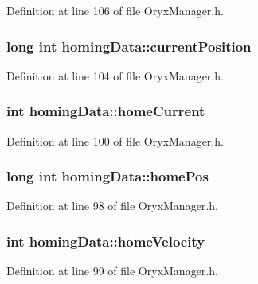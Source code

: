 \-Definition at line 106 of file \-Oryx\-Manager.\-h.

\subsubsection[{current\-Position}]{\setlength{\rightskip}{0pt plus 5cm}long int {\bf homing\-Data\-::current\-Position}}\label{structhomingData_aadb93b389f3ab09c2d3bc918a53b5010}


\-Definition at line 104 of file \-Oryx\-Manager.\-h.

\subsubsection[{home\-Current}]{\setlength{\rightskip}{0pt plus 5cm}int {\bf homing\-Data\-::home\-Current}}\label{structhomingData_a12bdf4753e2477b7dc8b5a2891c91244}


\-Definition at line 100 of file \-Oryx\-Manager.\-h.

\subsubsection[{home\-Pos}]{\setlength{\rightskip}{0pt plus 5cm}long int {\bf homing\-Data\-::home\-Pos}}\label{structhomingData_a8fc6a3b76140d36e34d98de45c54c610}


\-Definition at line 98 of file \-Oryx\-Manager.\-h.

\subsubsection[{home\-Velocity}]{\setlength{\rightskip}{0pt plus 5cm}int {\bf homing\-Data\-::home\-Velocity}}\label{structhomingData_ad44bc7521cb50113bc2660b21db4aa1b}


\-Definition at line 99 of file \-Oryx\-Manager.\-h.

